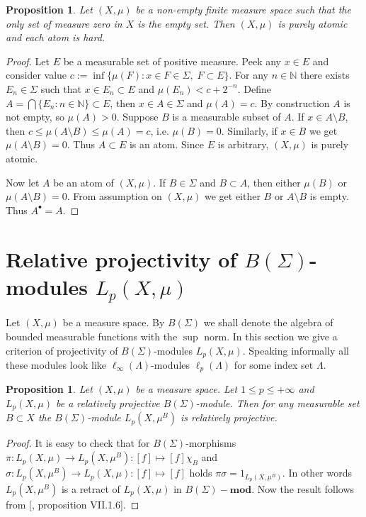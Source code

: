 \documentclass[12pt]{article}
\newtheorem{proposition}[theorem]{Proposition}
\begin{document}
\begin{proposition}\label{GenniunelyAtomicMeasCharac} Let $(X,\mu)$ be a
    non-empty finite measure space such that the only set of measure zero in $X$
    is the empty set. Then $(X,\mu)$ is purely atomic and each atom is hard.
\end{proposition}
\begin{proof} Let $E$ be a measurable set of positive measure. Peek any $x\in E$
    and consider value $c:=\inf \{\mu(F):x\in F\in \Sigma,\; F\subset E\}$. For
    any $n\in\mathbb{N}$ there exists $E_n\in\Sigma$ such that $x\in E_n\subset
        E$ and $\mu(E_n)<c+2^{-n}$. Define $A=\bigcap \{E_n:n\in\mathbb{N}\}\subset
        E$, then $x\in A\in\Sigma$ and $\mu(A)=c$. By construction $A$ is not empty,
    so $\mu(A)>0$. Suppose $B$ is a measurable subset of $A$. If $x\in
        A\setminus B$, then $c \leq\mu(A\setminus B)\leq\mu(A)=c$, i.e. $\mu(B)=0$.
    Similarly, if $x\in B$ we get $\mu(A\setminus B)=0$. Thus $A\subset E$ is an
    atom. Since $E$ is arbitrary, $(X,\mu)$ is purely atomic.

    Now let $A$ be an atom of $(X,\mu)$. If $B\in\Sigma$ and $B\subset A$, then
    either $\mu(B)$ or $\mu(A\setminus B)=0$. From assumption on $(X,\mu)$ we
    get either $B$ or $A\setminus B$ is empty. Thus $A^\bullet=A$.
\end{proof}


\section{Relative projectivity of \texorpdfstring{$B(\Sigma)$}{BSigma}-modules
  \texorpdfstring{$L_p(X,\mu)$}{LpXmu}
 }\label{SectionRelativeProjectivityOfBSigmaModulesLpXmu}

Let $(X,\mu)$ be a measure space. By $B(\Sigma)$ we shall denote the algebra of
bounded measurable functions with the  $\sup$ norm. In this section we give a
criterion of projectivity of $B(\Sigma)$-modules $L_p(X,\mu)$. Speaking
informally all these modules look like $\ell_\infty(\Lambda)$-modules
$\ell_p(\Lambda)$ for some index set $\Lambda$.

\begin{proposition}\label{BSigmaModLpRetrProj} Let $(X,\mu)$ be a measure space.
    Let $1\leq p\leq +\infty$ and $L_p(X,\mu)$ be a relatively projective
    $B(\Sigma)$-module. Then for any measurable set $B\subset X$ the
    $B(\Sigma)$-module $L_p(X,\mu^B)$ is relatively projective.
\end{proposition}
\begin{proof} It is easy to check that for $B(\Sigma)$-morphisms
    $\pi:L_p(X,\mu)\to L_p(X,\mu^B):[f]\mapsto [f]\chi_B$ and
    $\sigma:L_p(X,\mu^B)\to L_p(X,\mu):[f]\mapsto [f]$ holds
    $\pi\sigma=1_{L_p(X,\mu^B)}$. In other words $L_p(X,\mu^B)$ is a retract of
    $L_p(X,\mu)$ in $B(\Sigma)-\mathbf{mod}$. Now the result follows from
        [\cite{HelBanLocConvAlg}, proposition VII.1.6].
\end{proof}
\end{document}
